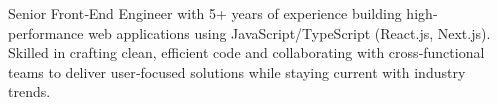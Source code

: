 

\begin{cvparagraph}

Senior Front‐End Engineer with 5+ years of experience building high‐performance web applications using JavaScript/TypeScript (React.js, Next.js). Skilled in crafting clean, efficient code and collaborating with cross‐functional teams to deliver user‐focused solutions while staying current with industry trends.
\end{cvparagraph}
